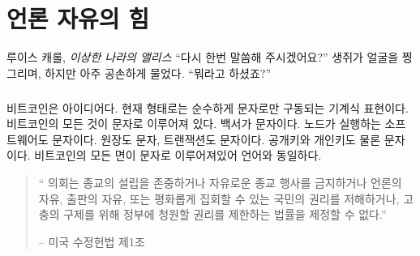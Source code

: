 \chapter{언론 자유의 힘}
\label{les:6}

\begin{chapquote}{루이스 캐롤, \textit{이상한 나라의 앨리스}}
	\enquote{다시 한번 말씀해 주시겠어요?} 생쥐가 얼굴을 찡그리며, 하지만 아주 공손하게 물었다. \enquote{뭐라고 하셨죠?}
\end{chapquote}

\paragraph{}
비트코인은 아이디어다. 현재 형태로는 순수하게 문자로만 구동되는 기계식 표현이다.
비트코인의 모든 것이 문자로 이루어져 있다. 백서가 문자이다. 노드가 실행하는 소프트웨어도 문자이다. 원장도 문자, 트랜잭션도 문자이다. 
공개키와 개인키도 물론 문자이다. 비트코인의 모든 면이 문자로 이루어져있어 언어와 동일하다.

\begin{quotation}\begin{samepage}
		\enquote{
			의회는 종교의 설립을 존중하거나 자유로운 종교 행사를 금지하거나 
			언론의 자유, 출판의 자유, 또는 평화롭게 집회할 수 있는 국민의 권리를 저해하거나,  
			고충의 구제를 위해 정부에 청원할 권리를 제한하는 법률을 제정할 수 없다.}
		\begin{flushright} -- 미국 수정헌법 제1조
\end{flushright}\end{samepage}\end{quotation}

